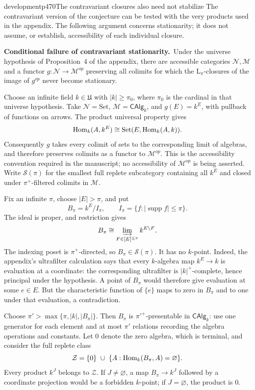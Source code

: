 \begin{dcomment}{development}{p470}{The contravariant closures also need not stabilize}
The contravariant version of the conjecture can be tested with the very products used in the appendix. The following argument concerns stationarity; it does not assume, or establish, accessibility of each individual closure.

\textbf{Conditional failure of contravariant stationarity.}\ours\
Under the universe hypothesis of Proposition~4 of the appendix, there are accessible categories $\mathcal N,\mathcal M$ and a functor $g:\mathcal N\to\mathcal M^{op}$ preserving all colimits for which the $\mathrm L_\pi$-closures of the image of $g^{op}$ never become stationary.

Choose an infinite field $k\in\mathfrak U$ with $|k|\ge\pi_0$, where $\pi_0$ is the cardinal in that universe hypothesis. Take $\mathcal N=\mathrm{Set}$, $\mathcal M=\mathsf{CAlg}_k$, and $g(E)=k^E$, with pullback of functions on arrows. The product universal property gives
\[
 \operatorname{Hom}_k(A,k^E)\cong\mathrm{Set}(E,\operatorname{Hom}_k(A,k)).
\]
Consequently $g$ takes every colimit of sets to the corresponding limit of algebras, and therefore preserves colimits as a functor to $\mathcal M^{op}$. This is the accessibility convention required in the manuscript; no accessibility of $\mathcal M^{op}$ is being asserted. Write $\mathcal S(\pi)$ for the smallest full replete subcategory containing all $k^E$ and closed under $\pi^+$-filtered colimits in $\mathcal M$.

Fix an infinite $\pi$, choose $|E|>\pi$, and put
\[
 B_\pi= k^E/I_\pi,
 \qquad I_\pi=\{f:|\operatorname{supp}f|\le\pi\}.
\]
The ideal is proper, and restriction gives
\[
 B_\pi\cong\varinjlim_{F\in[E]^{\le\pi}} k^{E\setminus F}.
\]
The indexing poset is $\pi^+$-directed, so $B_\pi\in\mathcal S(\pi)$. It has no $k$-point. Indeed, the appendix's ultrafilter calculation says that every $k$-algebra map $k^E\to k$ is evaluation at a coordinate: the corresponding ultrafilter is $|k|^+$-complete, hence principal under the hypothesis. A point of $B_\pi$ would therefore give evaluation at some $e\in E$. But the characteristic function of $\{e\}$ maps to zero in $B_\pi$ and to one under that evaluation, a contradiction.

Choose $\pi'>\max\{\pi,|k|,|B_\pi|\}$. Then $B_\pi$ is $\pi'^+$-presentable in $\mathsf{CAlg}_k$: use one generator for each element and at most $\pi'$ relations recording the algebra operations and constants. Let $0$ denote the zero algebra, which is terminal, and consider the full replete class
\[
 \mathcal Z=\{0\}\ \cup\
 \{A:\operatorname{Hom}_k(B_\pi,A)=\varnothing\}.
\]
Every product $k^J$ belongs to $\mathcal Z$. If $J\ne\varnothing$, a map $B_\pi\to k^J$ followed by a coordinate projection would be a forbidden $k$-point; if $J=\varnothing$, the product is $0$.


\end{dcomment}
